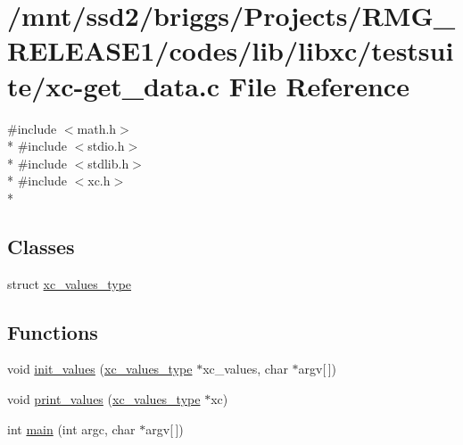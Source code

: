 \hypertarget{xc-get__data_8c}{\section{/mnt/ssd2/briggs/\-Projects/\-R\-M\-G\-\_\-\-R\-E\-L\-E\-A\-S\-E1/codes/lib/libxc/testsuite/xc-\/get\-\_\-data.c File Reference}
\label{xc-get__data_8c}
}
{\ttfamily \#include $<$math.\-h$>$}\\*
{\ttfamily \#include $<$stdio.\-h$>$}\\*
{\ttfamily \#include $<$stdlib.\-h$>$}\\*
{\ttfamily \#include $<$xc.\-h$>$}\\*
\subsection*{Classes}
\begin{DoxyCompactItemize}
\item 
struct \hyperlink{structxc__values__type}{xc\-\_\-values\-\_\-type}
\end{DoxyCompactItemize}
\subsection*{Functions}
\begin{DoxyCompactItemize}
\item 
void \hyperlink{xc-get__data_8c_a473605f591fb1b042d55c4ba502f9006}{init\-\_\-values} (\hyperlink{structxc__values__type}{xc\-\_\-values\-\_\-type} $\ast$xc\-\_\-values, char $\ast$argv\mbox{[}$\,$\mbox{]})
\item 
void \hyperlink{xc-get__data_8c_a7b0eb15d07f10ded086dd83a34f9aa63}{print\-\_\-values} (\hyperlink{structxc__values__type}{xc\-\_\-values\-\_\-type} $\ast$xc)
\item 
int \hyperlink{xc-get__data_8c_a0ddf1224851353fc92bfbff6f499fa97}{main} (int argc, char $\ast$argv\mbox{[}$\,$\mbox{]})
\end{DoxyCompactItemize}


